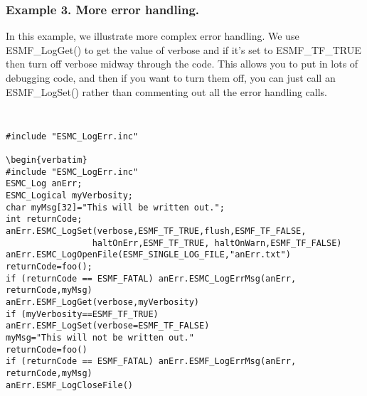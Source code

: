 \subsubsection{Example 3. More error handling. }

In this example, we illustrate more complex error handling.  We use
ESMF\_LogGet() to get the value of verbose and if it's set to ESMF\_TF\_TRUE
then turn off verbose midway through the code.  This allows you to put in lots
of debugging code, and then if you want to turn them off, you can just call
an ESMF\_LogSet() rather than commenting out all the error handling calls.
{\tt
\begin{verbatim}
#include "ESMC_LogErr.inc"

\begin{verbatim}
#include "ESMC_LogErr.inc" 
ESMC_Log anErr;
ESMC_Logical myVerbosity;
char myMsg[32]="This will be written out.";
int returnCode; 
anErr.ESMC_LogSet(verbose,ESMF_TF_TRUE,flush,ESMF_TF_FALSE,
                 haltOnErr,ESMF_TF_TRUE, haltOnWarn,ESMF_TF_FALSE)
anErr.ESMC_LogOpenFile(ESMF_SINGLE_LOG_FILE,"anErr.txt")
returnCode=foo();
if (returnCode == ESMF_FATAL) anErr.ESMC_LogErrMsg(anErr, returnCode,myMsg) 
anErr.ESMF_LogGet(verbose,myVerbosity)
if (myVerbosity==ESMF_TF_TRUE) anErr.ESMF_LogSet(verbose=ESMF_TF_FALSE)
myMsg="This will not be written out."
returnCode=foo()
if (returnCode == ESMF_FATAL) anErr.ESMF_LogErrMsg(anErr, returnCode,myMsg)
anErr.ESMF_LogCloseFile()
\end{verbatim}
\tt}

